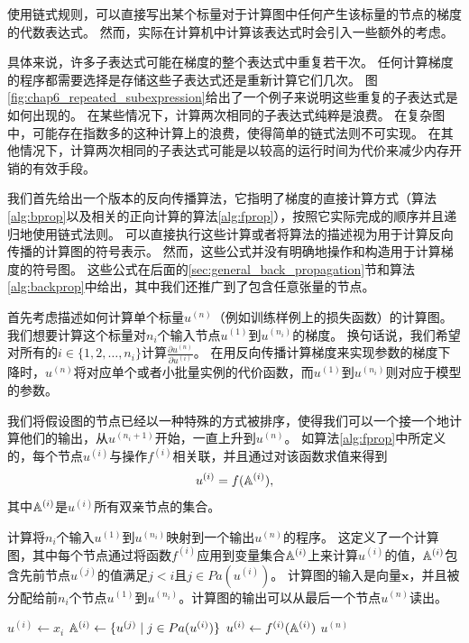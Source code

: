 使用链式规则，可以直接写出某个标量对于计算图中任何产生该标量的节点的梯度的代数表达式。
然而，实际在计算机中计算该表达式时会引入一些额外的考虑。

具体来说，许多子表达式可能在梯度的整个表达式中重复若干次。
任何计算梯度的程序都需要选择是存储这些子表达式还是重新计算它们几次。
图\ref{fig:chap6_repeated_subexpression}给出了一个例子来说明这些重复的子表达式是如何出现的。
在某些情况下，计算两次相同的子表达式纯粹是浪费。
在复杂图中，可能存在指数多的这种计算上的浪费，使得简单的链式法则不可实现。
在其他情况下，计算两次相同的子表达式可能是以较高的运行时间为代价来减少内存开销的有效手段。

我们首先给出一个版本的反向传播算法，它指明了梯度的直接计算方式（算法\ref{alg:bprop}以及相关的正向计算的算法\ref{alg:fprop}），按照它实际完成的顺序并且递归地使用链式法则。
可以直接执行这些计算或者将算法的描述视为用于计算反向传播的计算图的符号表示。
然而，这些公式并没有明确地操作和构造用于计算梯度的符号图。
这些公式在后面的\ref{sec:general_back_propagation}节和算法\ref{alg:backprop}中给出，其中我们还推广到了包含任意张量的节点。

首先考虑描述如何计算单个标量$u^{(n)}$（例如训练样例上的损失函数）的计算图。
我们想要计算这个标量对$n_i$个输入节点$u^{(1)}$到$u^{(n_i)}$的梯度。
换句话说，我们希望对所有的$i\in\{1,2,\ldots,n_i\}$计算$\frac{\partial u^{(n)}}{\partial u^{(i)}}$。
在用反向传播计算梯度来实现参数的梯度下降时，$u^{(n)}$将对应单个或者小批量实例的代价函数，而$u^{(1)}$到$u^{(n_i)}$则对应于模型的参数。


我们将假设图的节点已经以一种特殊的方式被排序，使得我们可以一个接一个地计算他们的输出，从$u^{(n_i+1)}$开始，一直上升到$u^{(n)}$。
如算法\ref{alg:fprop}中所定义的，每个节点$u^{(i)}$与操作$f^{(i)}$相关联，并且通过对该函数求值来得到
\begin{equation}
  u^{(i)} = f(\mathbb{A}^{(i)}),
\end{equation}
其中$\mathbb{A}^{(i)}$是$u^{(i)}$所有双亲节点的集合。
\begin{algorithm}[htbp]
\caption{计算将$n_i$个输入$u^{(1)}$到$u^{(n_i)}$映射到一个输出$u^{(n)}$的程序。
这定义了一个计算图，其中每个节点通过将函数$f^{(i)}$应用到变量集合$\mathbb{A}^{(i)}$上来计算$u^{(i)}$的值，$\mathbb{A}^{(i)}$包含先前节点$u^{(j)}$的值满足$j<i$且$j \in Pa(u^{(i)})$。
计算图的输入是向量$\bm{x}$，并且被分配给前$n_i$个节点$u^{(1)}$到$u^{(n_i)}$。计算图的输出可以从最后一个节点$u^{(n)}$读出。}
\label{alg:fprop}
\begin{algorithmic}
 \STATE $u^{(i)} \leftarrow x_i$
\ENDFOR
{}
 \STATE $\mathbb{A}^{(i)} \leftarrow \{ u^{(j)} \mid j \in Pa(u^{(i)}) \}$
 \STATE $u^{(i)} \leftarrow f^{(i)}(\mathbb{A}^{(i)})$
\ENDFOR
{} $u^{(n)}$
\end{algorithmic}
\end{algorithm}

